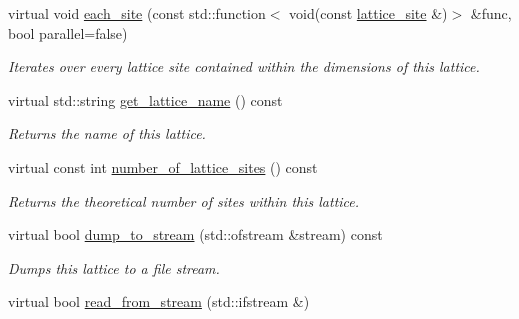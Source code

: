 \begin{DoxyCompactItemize}
virtual void \hyperlink{classsisl_1_1body__centered__cubic_ae46befbb818394f332b938d3b669581c}{each\+\_\+site} (const std\+::function$<$ void(const \hyperlink{namespacesisl_acd18feee4026583db6185df2b25434aa}{lattice\+\_\+site} \&)$>$ \&func, bool parallel=false)
\begin{DoxyCompactList}\small\item\em Iterates over every lattice site contained within the dimensions of this lattice. \end{DoxyCompactList}\item 
\mbox{\label{classsisl_1_1body__centered__cubic_a0adca596900e43f75eabf139c964d91f}} 
virtual std\+::string \hyperlink{classsisl_1_1body__centered__cubic_a0adca596900e43f75eabf139c964d91f}{get\+\_\+lattice\+\_\+name} () const
\begin{DoxyCompactList}\small\item\em Returns the name of this lattice. \end{DoxyCompactList}\item 
\mbox{\label{classsisl_1_1body__centered__cubic_a6f80df144a39eba292b6430179ea8bc0}} 
virtual const int \hyperlink{classsisl_1_1body__centered__cubic_a6f80df144a39eba292b6430179ea8bc0}{number\+\_\+of\+\_\+lattice\+\_\+sites} () const
\begin{DoxyCompactList}\small\item\em Returns the theoretical number of sites within this lattice. \end{DoxyCompactList}\item 
\mbox{\label{classsisl_1_1body__centered__cubic_adb35d1330a63d021eed98700f4cb0381}} 
virtual bool \hyperlink{classsisl_1_1body__centered__cubic_adb35d1330a63d021eed98700f4cb0381}{dump\+\_\+to\+\_\+stream} (std\+::ofstream \&stream) const
\begin{DoxyCompactList}\small\item\em Dumps this lattice to a file stream. \end{DoxyCompactList}\item 
\mbox{\label{classsisl_1_1body__centered__cubic_af017fb6d5b54b573bcfba03740e51160}} 
virtual bool \hyperlink{classsisl_1_1body__centered__cubic_af017fb6d5b54b573bcfba03740e51160}{read\+\_\+from\+\_\+stream} (std\+::ifstream \&)

\end{DoxyCompactItemize}
